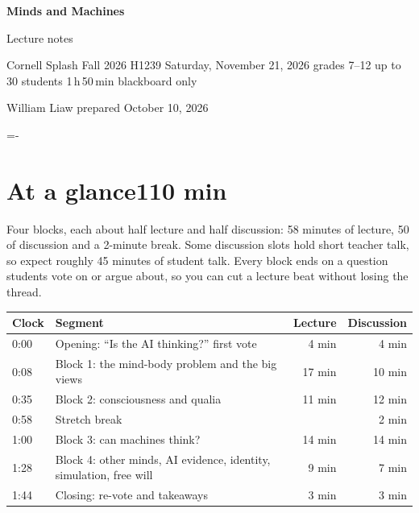 \documentclass[11pt,letterpaper]{article}
\makeatletter
\newcommand{\keep}[1]{\par\penalty\z@\begingroup\dimen@=#1\relax\dimen@ii=\pagegoal\advance\dimen@ii-\pagetotal
  \ifdim\dimen@>\dimen@ii\ifdim\dimen@ii>\z@\vfil\break\fi\fi\endgroup}
\newcommand{\block}[2]{\keep{6\baselineskip}\section[#1]{#1\hfill{\normalsize\mdseries\color{muted}#2}}}
\makeatother
\begin{document}
{\sffamily
{\Huge\bfseries Minds and Machines}\par\vspace{3pt}
{\Large\color{muted} Lecture notes}\par\vspace{6pt}
{\small\color{muted} Cornell Splash Fall 2026 \textperiodcentered{} H1239 \textperiodcentered{} Saturday, November 21, 2026 \textperiodcentered{} grades 7--12 \textperiodcentered{} up to 30 students \textperiodcentered{} 1\,h\,50\,min \textperiodcentered{} blackboard only\par
William Liaw \textperiodcentered{} prepared October 10, 2026}\par}
\vspace{4pt}{\color{accent}\rule{\linewidth}{1.2pt}}

\block{At a glance}{110 min}

Four blocks, each about half lecture and half discussion: 58 minutes of lecture, 50 of discussion and a 2-minute break. Some discussion slots hold short teacher talk, so expect roughly 45 minutes of student talk. Every block ends on a question students vote on or argue about, so you can cut a lecture beat without losing the thread.

\begin{center}\sffamily\small
\begin{tabularx}{\linewidth}{@{}l X r r@{}}
\toprule
\textbf{Clock} & \textbf{Segment} & \textbf{Lecture} & \textbf{Discussion}\\
\midrule
0:00 & Opening: ``Is the AI thinking?'' first vote & 4 min & 4 min\\
0:08 & Block 1: the mind-body problem and the big views & 17 min & 10 min\\
0:35 & Block 2: consciousness and qualia & 11 min & 12 min\\
0:58 & Stretch break & & 2 min\\
1:00 & Block 3: can machines think? & 14 min & 14 min\\
1:28 & Block 4: other minds, AI evidence, identity, simulation, free will & 9 min & 7 min\\
1:44 & Closing: re-vote and takeaways & 3 min & 3 min\\
\bottomrule
\end{tabularx}
\end{center}
\end{document}
